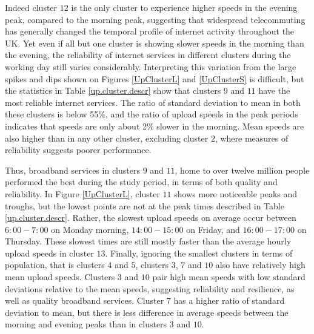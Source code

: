 \documentclass[,]{sagej}
\begin{document}
Indeed cluster \(12\) is the only cluster to experience higher speeds in
the evening peak, compared to the morning peak, suggesting that
widespread telecommuting has generally changed the temporal profile of
internet activity throughout the UK. Yet even if all but one cluster is
showing slower speeds in the morning than the evening, the reliability
of internet services in different clusters during the working day still
varies considerably. Interpreting this variation from the large spikes
and dips shown on Figures \ref{UpClusterL} and \ref{UpClusterS} is
difficult, but the statistics in Table \ref{up.cluster.descr} show that
clusters \(9\) and \(11\) have the most reliable internet services. The
ratio of standard deviation to mean in both these clusters is below
55\%, and the ratio of upload speeds in the peak periods indicates that
speeds are only about 2\% slower in the morning. Mean speeds are also
higher than in any other cluster, excluding cluster \(2\), where
measures of reliability suggests poorer performance.

Thus, broadband services in clusters \(9\) and \(11\), home to over
twelve million people performed the best during the study period, in
terms of both quality and reliability. In Figure \ref{UpClusterL},
cluster \(11\) shows more noticeable peaks and troughs, but the lowest
points are not at the peak times described in Table
\ref{up.cluster.descr}. Rather, the slowest upload speeds on average
occur between \(6:00-7:00\) on Monday morning, \(14:00-15:00\) on
Friday, and \(16:00-17:00\) on Thursday. These slowest times are still
mostly faster than the average hourly upload speeds in cluster \(13\).
Finally, ignoring the smallest clusters in terms of population, that is
clusters \(4\) and \(5\), clusters \(3\), \(7\) and \(10\) also have
relatively high mean upload speeds. Clusters \(3\) and \(10\) pair high
mean speeds with low standard deviations relative to the mean speeds,
suggesting reliability and resilience, as well as quality broadband
services. Cluster \(7\) has a higher ratio of standard deviation to
mean, but there is less difference in average speeds between the morning
and evening peaks than in clusters \(3\) and \(10\).
\end{document}
